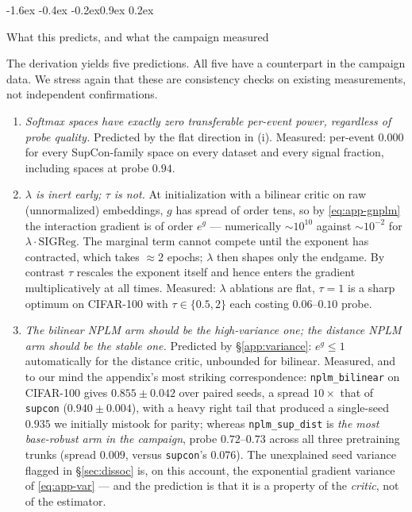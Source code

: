 \documentclass{article}
\makeatletter
\renewcommand\subsection{\@startsection{subsection}{2}{\z@}%
  {-1.6ex \@plus -0.4ex \@minus -0.2ex}{0.9ex \@plus 0.2ex}%
  {\normalsize\bf\raggedright}}
\makeatother
\begin{document}
\subsection{What this predicts, and what the campaign measured}
\label{app:predictions}

The derivation yields five predictions. All five have a counterpart in the
campaign data. We stress again that these are consistency checks on existing
measurements, not independent confirmations.

\begin{enumerate}\itemsep3pt
\item \emph{Softmax spaces have exactly zero transferable per-event power,
regardless of probe quality.} Predicted by the flat direction in (i).
Measured: per-event $0.000$ for every SupCon-family space on every dataset and
every signal fraction, including spaces at probe $0.94$.

\item \emph{$\lambda$ is inert early; $\tau$ is not.} At initialization with a
bilinear critic on raw (unnormalized) embeddings, $g$ has spread of order tens,
so by \eqref{eq:app-gnplm} the interaction gradient is of order $e^{g}$ ---
numerically $\sim\!10^{10}$ against $\sim\!10^{-2}$ for
$\lambda\cdot\mathrm{SIGReg}$. The marginal term cannot compete until the
exponent has contracted, which takes $\approx2$ epochs; $\lambda$ then shapes
only the endgame. By contrast $\tau$ rescales the exponent itself and hence
enters the gradient multiplicatively at all times. Measured: $\lambda$
ablations are flat, $\tau=1$ is a sharp optimum on CIFAR-100 with $\tau\in
\{0.5,2\}$ each costing $0.06$--$0.10$ probe.

\item \emph{The bilinear NPLM arm should be the high-variance one; the distance
NPLM arm should be the stable one.} Predicted by \S\ref{app:variance}:
$e^{g}\le1$ automatically for the distance critic, unbounded for bilinear.
Measured, and to our mind the appendix's most striking correspondence:
\texttt{nplm\_bilinear} on CIFAR-100 gives $0.855\pm0.042$ over paired seeds,
a spread $10\times$ that of \texttt{supcon} ($0.940\pm0.004$), with a heavy
right tail that produced a single-seed $0.935$ we initially mistook for parity;
whereas \texttt{nplm\_sup\_dist} is \emph{the most base-robust arm in the
campaign}, probe $0.72$--$0.73$ across all three pretraining trunks (spread
$0.009$, versus \texttt{supcon}'s $0.076$). The unexplained seed variance
flagged in \S\ref{sec:dissoc} is, on this account, the exponential gradient
variance of \eqref{eq:app-var} --- and the prediction is that it is a property
of the \emph{critic}, not of the estimator.


\end{enumerate}
\end{document}
